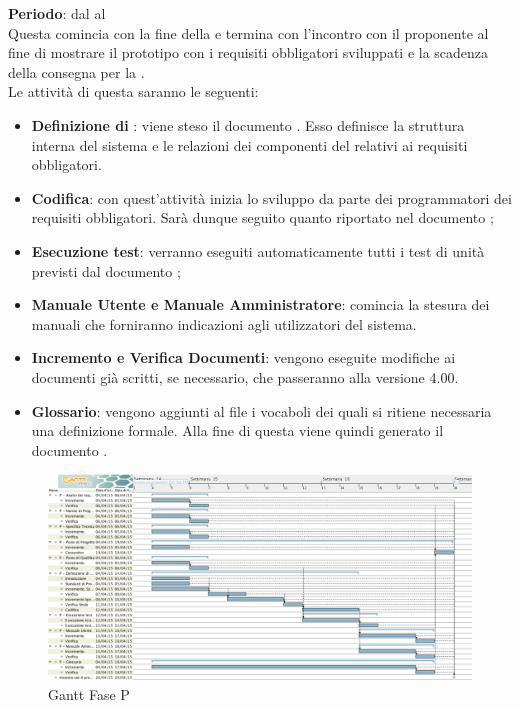 	\textbf{Periodo}: dal  al  \\Questa {} comincia con la fine della  e termina con l'incontro con il proponente al fine di mostrare il prototipo con i requisiti obbligatori sviluppati e la scadenza della consegna per la .\\Le attività di questa  saranno le seguenti:
	\begin{itemize}
		\item\textbf{Definizione di }: viene steso il documento . Esso definisce la struttura interna del sistema e le relazioni dei componenti del  relativi ai requisiti obbligatori.
		\item \textbf{Codifica}: con quest'attività inizia lo sviluppo da parte dei programmatori dei requisiti obbligatori. Sarà dunque seguito quanto riportato nel documento ;
		\item \textbf{Esecuzione test}: verranno eseguiti automaticamente tutti i test di unità previsti dal documento ;
		\item\textbf{Manuale Utente e Manuale Amministratore}: comincia la stesura dei manuali che forniranno indicazioni agli utilizzatori del sistema.
		\item\textbf{Incremento e Verifica Documenti}: vengono eseguite modifiche ai documenti già scritti, se necessario, che passeranno alla versione 4.00.
		\item\textbf{Glossario}: vengono aggiunti al file  i vocaboli dei quali si ritiene necessaria una definizione formale. Alla fine di questa  viene quindi generato il documento .
	\end{itemize}
	\begin{figure}[H]\centering
		\includegraphics[width=\textwidth]{PianoDiProgetto/Pics/FaseP.png}
	\caption{Gantt Fase P}
\end{figure}

